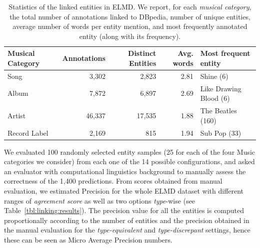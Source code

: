\begin{table}[ht!]
\small
\centering
\def\arraystretch{1.2}
	\begin{tabular}{|l|r|r|r|l|}
\hline
\textbf{Musical Category} & \textbf{Annotations} & \textbf{Distinct Entities} & \textbf{Avg. words} & \textbf{Most frequent entity} \\
\hline
Song & 3,302 & 2,823 & 2.81 & Shine (6) \\
Album & 7,872 & 6,897 & 2.69 & Like Drawing Blood (6) \\
Artist & 46,337 & 17,535 & 1.88 & The Beatles (160) \\
Record Label & 2,169 & 815 & 1.94 & Sub Pop (33) \\
\hline
	\end{tabular}
	\caption{Statistics of the linked entities in ELMD. We report, for each \textit{musical category}, the total number of annotations linked to DBpedia, number of unique entities, average number of words per entity mention, and most frequently annotated entity (along with its frequency).}
	\label{tbl:linking:statistics}
\end{table}


We evaluated 100 randomly selected entity samples (25 for each of the four Music categories we consider) from each one of the 14 possible configurations, and asked an eva\-luator with computational linguistics background to manually assess the correctness of the 1,400 predictions. From scores obtained from manual evaluation, we estimated Precision for the whole \textsc{ELMD} dataset with different ranges of \textit{agreement score} as well as two options \textit{type}-wise (see Table~\ref{tbl:linking:results}). The precision value for all the entities is computed proportionally according to the number of entities and the precision obtained in the manual evaluation for the \textit{type-equivalent} and \textit{type-discrepant} settings, hence these can be seen as Micro Average Precision numbers.

